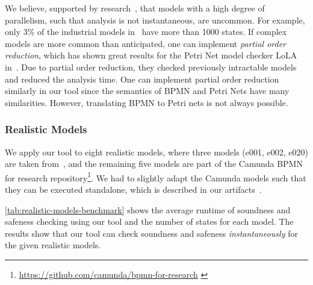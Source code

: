 \documentclass[runningheads]{llncs}
\begin{document}
We believe, supported by research~\cite{fahlandAnalysisDemandInstantaneous2011}, that models with a high degree of parallelism, such that analysis is not instantaneous, are uncommon.
For example, only 3\% of the industrial models in~\cite{fahlandAnalysisDemandInstantaneous2011} have more than 1000 states.
If complex models are more common than anticipated, one can implement \textit{partial order reduction}, which has shown great results for the Petri Net model checker LoLA in~\cite{fahlandAnalysisDemandInstantaneous2011}.
Due to partial order reduction, they checked previously intractable models and reduced the analysis time.
One can implement partial order reduction similarly in our tool since the semantics of BPMN and Petri Nets have many similarities.
However, translating BPMN to Petri nets is not always possible. %

\subsubsection{Realistic Models}
We apply our tool to eight realistic models, where three models (e001, e002, e020) are taken from~\cite{houhouFirstOrderLogicVerification2022}, and the remaining five models are part of the Camunda BPMN for research repository\footnote{\url{https://github.com/camunda/bpmn-for-research} \label{footnote:camundaResearch}}.
We had to slightly adapt the Camunda models such that they can be executed standalone, which is described in our artifacts~\cite{noauthorgivenBPM2024Artifacts2024}.

\autoref{tab:realistic-models-benchmark} shows the average runtime of soundness and safeness checking using our tool and the number of states for each model.
The results show that our tool can check soundness and safeness \textit{instantaneously} for the given realistic models.
\end{document}
